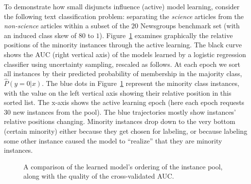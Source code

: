 To demonstrate how small disjuncts influence (active) model learning, consider the following text classification problem: separating the \emph{science} articles from the \emph{non-science} articles within a subset of the $20$ Newsgroups benchmark set (with an induced class skew of $80$ to $1$).  Figure~\ref{fig:minoritypos} examines graphically the relative positions of the minority instances through the active learning. The black curve shows the AUC (right vertical axis) of the models learned by a logistic regression classifier using uncertainty sampling, rescaled as follows. At each epoch we sort all instances by their predicted probability of membership in the majority class, $\hat{P}(y = 0 | x)$. The blue dots in Figure~\ref{fig:minoritypos} represent the minority class instances, with the value on the left vertical axis showing their relative position in this sorted list. The x-axis shows the active learning epoch (here each epoch requests $30$ new instances from the pool). The blue trajectories mostly show instances' relative positions changing. Minority instances drop down to the very bottom (certain minority) either because they get chosen for labeling, or because labeling some other instance caused the model to ``realize'' that they are minority instances.

\begin{figure}[h!]
\caption{A comparison of the learned model's ordering of the instance
  pool, along with the quality of the cross-validated AUC.}
\label{fig:minoritypos}
\end{figure}

